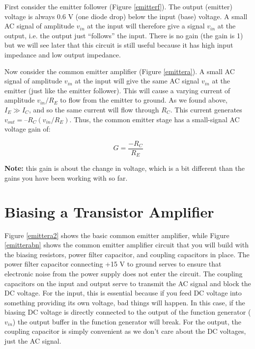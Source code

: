 \documentclass[10pt]{PhysLab1C} %
\begin{document}
First consider the emitter follower (Figure \ref{emitterf}). The output (emitter) voltage is always 0.6 V (one diode drop)
below the input (base) voltage. A small AC signal of amplitude $v_{in}$ at the input will therefore give a signal $v_{in}$ at
the output, i.e. the output just “follows” the input. There is no gain (the gain is 1) but we will see later that this
circuit is still useful because it has high input impedance and low output impedance.

Now consider the common emitter amplifier (Figure \ref{emittera}). A small AC signal of amplitude $v_{in}$ at the input will
give the same AC signal $v_{in}$ at the emitter (just like the emitter follower). This will cause a varying current of
amplitude $v_{in}/R_E$ to flow from the emitter to ground. As we found above, $I_E\gg I_C$, and so the same current will
flow through $R_C$. This current generates $v_{out} = –R_C(v_{in}/R_E)$. Thus, the common emitter stage has a small-signal
AC voltage gain of:

$$G=\frac{-R_C}{R_E}$$

\textbf{Note:} this gain is about the change in voltage, which is a bit different than the gains you have been working
with so far.



\section{Biasing a Transistor Amplifier}

Figure \ref{emittera2} shows the basic common emitter amplifier, while Figure \ref{emitterabn} shows the common emitter
amplifier circuit that you will build with the biasing resistors, power filter capacitor, and coupling capacitors in
place. The power filter capacitor connecting +15 V to ground serves to ensure that electronic noise from the
power supply does not enter the circuit. The coupling capacitors on the input and output serve to transmit the
AC signal and block the DC voltage. For the input, this is essential because if you feed DC voltage into
something providing its own voltage, bad things will happen. In this case, if the biasing DC voltage is directly
connected to the output of the function generator ($v_{in}$) the output buffer in the function generator will break.
For the output, the coupling capacitor is simply convenient as we don’t care about the DC voltages, just the AC
signal.
\end{document}
